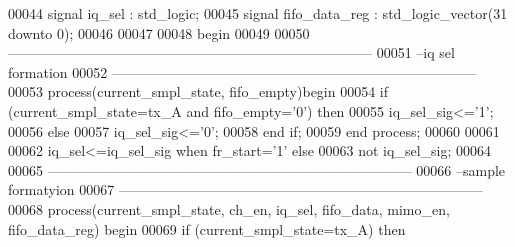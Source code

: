 \begin{DoxyCode}
00044   \textcolor{keywordflow}{signal} \textcolor{vhdlchar}{iq_sel}     \textcolor{vhdlchar}{:} \textcolor{comment}{std\_logic};
00045   \textcolor{keywordflow}{signal} \textcolor{vhdlchar}{fifo_data_reg}  \textcolor{vhdlchar}{:} \textcolor{comment}{std\_logic\_vector}\textcolor{vhdlchar}{(}\textcolor{vhdllogic}{}\textcolor{vhdllogic}{31} \textcolor{keywordflow}{downto} \textcolor{vhdllogic}{}\textcolor{vhdllogic}{0}\textcolor{vhdlchar}{)};
00046 
00047   
00048 \textcolor{vhdlkeyword}{begin}
00049   
00050 \textcolor{keyword}{------------------------------------------------------------------------------}
00051 \textcolor{keyword}{--iq sel formation}
00052 \textcolor{keyword}{------------------------------------------------------------------------------        }
00053 \textcolor{keywordflow}{process}(current_smpl_state, fifo_empty)\textcolor{keywordflow}{begin}
00054     \textcolor{keywordflow}{if} \textcolor{vhdlchar}{(}\textcolor{vhdlchar}{current_smpl_state}\textcolor{vhdlchar}{=}\textcolor{vhdlchar}{tx\_A} \textcolor{keywordflow}{and} \textcolor{vhdlchar}{fifo_empty}\textcolor{vhdlchar}{=}\textcolor{vhdlchar}{'}\textcolor{vhdllogic}{}\textcolor{vhdllogic}{0}\textcolor{vhdlchar}{'}\textcolor{vhdlchar}{)} \textcolor{keywordflow}{then}
00055             \textcolor{vhdlchar}{iq_sel_sig}\textcolor{vhdlchar}{<=}\textcolor{vhdlchar}{'}\textcolor{vhdllogic}{}\textcolor{vhdllogic}{1}\textcolor{vhdlchar}{'}; 
00056     \textcolor{keywordflow}{else}
00057           \textcolor{vhdlchar}{iq_sel_sig}\textcolor{vhdlchar}{<=}\textcolor{vhdlchar}{'}\textcolor{vhdllogic}{}\textcolor{vhdllogic}{0}\textcolor{vhdlchar}{'};
00058     \textcolor{keywordflow}{end} \textcolor{keywordflow}{if}; 
00059 \textcolor{keywordflow}{end} \textcolor{keywordflow}{process};
00060 
00061 
00062 \textcolor{vhdlchar}{iq_sel}\textcolor{vhdlchar}{<=}\textcolor{vhdlchar}{iq_sel_sig} \textcolor{keywordflow}{when} \textcolor{vhdlchar}{fr_start}\textcolor{vhdlchar}{=}\textcolor{vhdlchar}{'}\textcolor{vhdllogic}{}\textcolor{vhdllogic}{1}\textcolor{vhdlchar}{'} \textcolor{keywordflow}{else} 
00063         \textcolor{keywordflow}{not} \textcolor{vhdlchar}{iq_sel_sig}; 
00064   
00065 \textcolor{keyword}{------------------------------------------------------------------------------}
00066 \textcolor{keyword}{--sample formatyion}
00067 \textcolor{keyword}{------------------------------------------------------------------------------   }
00068  \textcolor{keywordflow}{process}(current_smpl_state, ch_en, iq_sel, fifo_data, mimo_en, fifo_data_reg) \textcolor{keywordflow}{begin} 
00069     \textcolor{keywordflow}{if} \textcolor{vhdlchar}{(}\textcolor{vhdlchar}{current_smpl_state}\textcolor{vhdlchar}{=}\textcolor{vhdlchar}{tx\_A}\textcolor{vhdlchar}{)} \textcolor{keywordflow}{then}

\end{DoxyCode}
